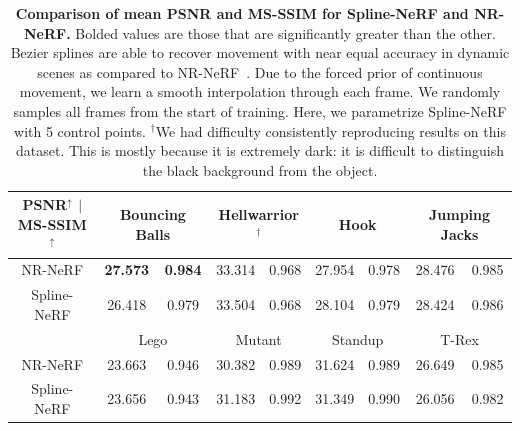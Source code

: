 \begin{table}[t]
    \centering
    \begin{tabular}{|c| c|c | c|c | c|c | c|c |}
    \hline
    \textbf{PSNR$^\uparrow$ $|$ MS-SSIM$^\uparrow$} & \multicolumn{2}{c|}{Bouncing Balls} & \multicolumn{2}{c|}{Hellwarrior$^\dagger$} & \multicolumn{2}{c|}{Hook} & \multicolumn{2}{c|}{Jumping Jacks} \\
    \hline
    NR-NeRF & \textbf{27.573} & \textbf{0.984}
           & 33.314 & 0.968
           & 27.954 & 0.978
           & 28.476 & 0.985 \\
    \hline
    Spline-NeRF & 26.418 & 0.979
               & 33.504 & 0.968
               & 28.104 & 0.979
               & 28.424 & 0.986 \\
    \hline
    & \multicolumn{2}{c|}{Lego} & \multicolumn{2}{c|}{Mutant} & \multicolumn{2}{c|}{Standup} & \multicolumn{2}{c|}{T-Rex} \\
    \hline
    NR-NeRF & 23.663 & 0.946
           & 30.382 & 0.989
           & 31.624 & 0.989
           & 26.649 & 0.985 \\
    \hline
    Spline-NeRF & 23.656 & 0.943
               & 31.183 & 0.992
               & 31.349 & 0.990
               & 26.056 & 0.982 \\
    \hline
    \end{tabular}
    \vspace{2pt}
    \caption{
        \label{tab:dnerf_cmp}
        \textbf{Comparison of mean PSNR and MS-SSIM for Spline-NeRF and NR-NeRF.} Bolded values are those that are significantly greater than the other.
        Bezier splines are able to recover movement with near equal accuracy in dynamic scenes as compared to NR-NeRF~\cite{tretschk2021nonrigid}. Due to the forced prior of continuous movement, we learn a smooth interpolation through each frame. We randomly samples all frames from the start of training. Here, we parametrize Spline-NeRF with 5 control points. \newline
        $^\dagger$We had difficulty consistently reproducing results on this dataset. This is mostly because it is extremely dark: it is difficult to distinguish the black background from the object.
    }
    \vspace{-6mm}
\end{table}

